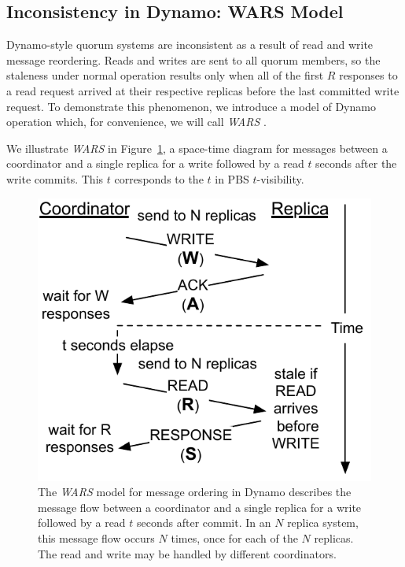 \documentclass{vldb}
\newcommand{\subsectionskip}{-0em}
\begin{document}
\vspace{\subsectionskip}\subsection{Inconsistency in Dynamo: WARS Model}

Dynamo-style quorum systems are inconsistent as a result of read and
write message reordering.  Reads and writes are sent to all quorum
members, so the staleness under normal operation results only when all
of the first $R$ responses to a read request arrived at their
respective replicas before the last committed write request.  To
demonstrate this phenomenon, we introduce a model of Dynamo operation
which, for convenience, we will call \textit{WARS} .

We illustrate \textit{WARS} in Figure~\ref{fig:dynamo-diagram}, a
space-time diagram for messages between a coordinator and a single
replica for a write followed by a read $t$ seconds after the write
commits.  This $t$ corresponds to the $t$ in PBS $t$-visibility.

\begin{figure}
\centering
\includegraphics[width=.8\columnwidth]{figs/dynamostale.pdf}
\vspace{-8pt}
\caption{The \textit{WARS} model for message ordering in Dynamo
  describes the message flow between a coordinator and a single
  replica for a write followed by a read $t$ seconds after commit.  In
  an $N$ replica system, this message flow occurs $N$ times, once for
  each of the $N$ replicas.  The read and write may be handled by
  different coordinators.}
\vspace{-12pt}
\label{fig:dynamo-diagram}
\end{figure}
\end{document}
